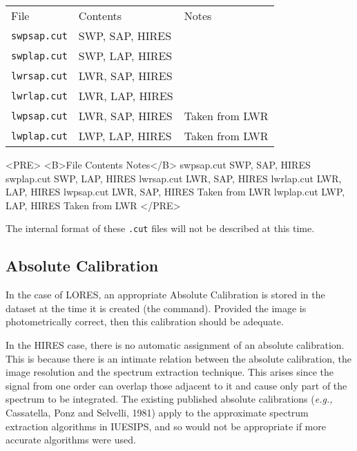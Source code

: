 \begin{latexonly}
\begin{tabular}{lll}
File             & Contents        & Notes\\
{\tt swpsap.cut} & SWP, SAP, HIRES & \\
{\tt swplap.cut} & SWP, LAP, HIRES & \\
{\tt lwrsap.cut} & LWR, SAP, HIRES & \\
{\tt lwrlap.cut} & LWR, LAP, HIRES & \\
{\tt lwpsap.cut} & LWR, SAP, HIRES & Taken from LWR\\
{\tt lwplap.cut} & LWP, LAP, HIRES & Taken from LWR\\
\end{tabular}
\end{latexonly}

\begin{htmlonly}
\begin{rawhtml}
<PRE>
<B>File          Contents           Notes</B>
swpsap.cut    SWP, SAP, HIRES
swplap.cut    SWP, LAP, HIRES
lwrsap.cut    LWR, SAP, HIRES
lwrlap.cut    LWR, LAP, HIRES
lwpsap.cut    LWR, SAP, HIRES    Taken from LWR
lwplap.cut    LWP, LAP, HIRES    Taken from LWR
</PRE>
\end{rawhtml}
\end{htmlonly}

The internal format of these \verb+.cut+ files will not be described at this
time.


\subsection{Absolute Calibration}

In the case of LORES, an appropriate Absolute Calibration is stored in the
dataset at the time it is created (the 
command)\@.  Provided the image is photometrically correct, then this
calibration should be adequate.

In the HIRES case, there is no automatic assignment of an absolute
calibration.  This is because there is an intimate relation between the
absolute calibration, the image resolution and the spectrum extraction
technique.  This arises since the signal from one order can overlap those
adjacent to it and cause only part of the spectrum to be integrated.
The existing published absolute calibrations ({\it{e.g.,}} Cassatella, Ponz and
Selvelli, 1981) apply to the approximate spectrum extraction algorithms in
IUESIPS, and so would not be appropriate if more accurate algorithms were used.

